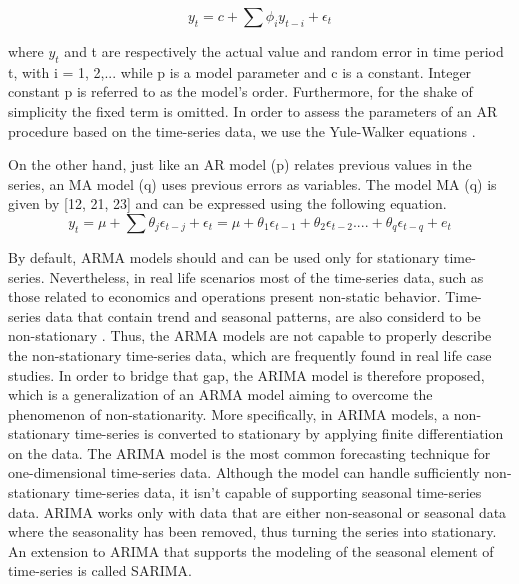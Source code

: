 $$y_t= c+\sum\phi_{i}y_{t-i}+\epsilon_t$$

\noindent where $y_t$ and t are respectively the actual value and random error in time period t, with i = 1, 2,... while p is a model parameter and c is a constant. Integer constant p is
referred to as the model's order. Furthermore, for the shake of simplicity the fixed term is omitted. In order to assess the parameters of an AR procedure based on the time-series data, we use the Yule-Walker equations .
\par On the other hand, just like an AR model (p) relates previous values in the series, an MA model (q) uses previous errors as variables. The model MA (q) is given by [12, 21, 23] and can be expressed using the following equation.
$$y_t= \mu +\sum\theta_{j}\epsilon_{t-j}+\epsilon_t=\mu +\theta_1\epsilon_{t-1} + \theta_2\epsilon_{t-2}.... +\theta_q\epsilon_{t-q} + e_t$$
\par By default, ARMA models should and can be used only for stationary time-series. Nevertheless, in real life scenarios most of the time-series data, such as those related to economics and operations present non-static behavior. Time-series data that contain trend and seasonal patterns, are also considerd to be non-stationary \cite{choi2012arma}. Thus, the ARMA models are not capable to properly describe the non-stationary time-series data, which are frequently found in real life case studies. In order to bridge that gap, the ARIMA model is therefore proposed, which is a generalization of an ARMA model aiming to overcome the phenomenon of non-stationarity. More specifically, in ARIMA models, a non-stationary time-series is converted to stationary by applying finite differentiation on the data. The ARIMA model is the most common forecasting technique for one-dimensional time-series data. Although the model can handle sufficiently non-stationary time-series data, it isn't capable of supporting seasonal time-series data. ARIMA works only with data that are either non-seasonal or seasonal data where the seasonality has been removed, thus turning the series into stationary. An extension to ARIMA that supports the modeling of the seasonal element of time-series is called SARIMA.
